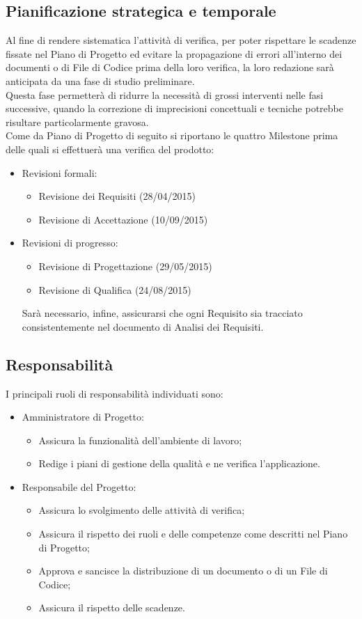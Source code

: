 {\subsection{Pianificazione strategica e temporale}{
	Al fine di rendere sistematica l'attività di verifica, per poter rispettare le scadenze fissate nel Piano di Progetto ed evitare la propagazione di errori all'interno dei documenti o di File di Codice prima della loro verifica, la loro redazione sarà anticipata da una fase di studio preliminare. \\
	Questa fase permetterà di ridurre la necessità di grossi interventi nelle fasi successive, quando la correzione di imprecisioni concettuali e tecniche potrebbe risultare particolarmente gravosa. \\
	Come da Piano di Progetto di seguito si riportano le quattro Milestone prima delle quali si effettuerà una verifica del prodotto:
	\begin{itemize}
		\item Revisioni formali:
		\begin{itemize}
			\item Revisione dei Requisiti (28/04/2015)
			\item Revisione di Accettazione (10/09/2015)
		\end{itemize}
		\item Revisioni di progresso:
		\begin{itemize}
			\item Revisione di Progettazione (29/05/2015)
			\item Revisione di Qualifica (24/08/2015)
		\end{itemize}
		Sarà necessario, infine, assicurarsi che ogni Requisito sia tracciato consistentemente nel documento di Analisi dei Requisiti.
	\end{itemize}
	}
\subsection{Responsabilità}{
I principali ruoli di responsabilità individuati sono:
\begin{itemize}
	\item Amministratore di Progetto:
	\begin{itemize}
		\item Assicura la funzionalità dell'ambiente di lavoro;
		\item Redige i piani di gestione della qualità e ne verifica l'applicazione.
	\end{itemize}
	\item Responsabile del Progetto:
	\begin{itemize}
		\item Assicura lo svolgimento delle attività di verifica;
		\item Assicura il rispetto dei ruoli e delle competenze come descritti nel Piano di Progetto;
		\item Approva e sancisce la distribuzione di un documento o di un File di Codice;
		\item Assicura il rispetto delle scadenze.
	\end{itemize}
\end{itemize}
}
}
